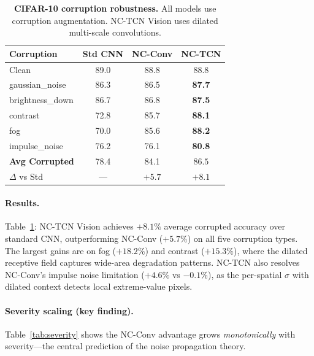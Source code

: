 \documentclass[10pt,twocolumn,letterpaper]{article}
\begin{document}
\begin{table}[t]
\centering
\caption{\textbf{CIFAR-10 corruption robustness.} All models use corruption augmentation. NC-TCN Vision uses dilated multi-scale convolutions.}
\label{tab:cifar10c}
\footnotesize
\setlength{\tabcolsep}{3pt}
\begin{tabular}{@{}lccc@{}}
\toprule
\textbf{Corruption} & \textbf{Std CNN} & \textbf{NC-Conv} & \textbf{NC-TCN} \\
\midrule
Clean              & 89.0 & 88.8 & 88.8 \\
\midrule
gaussian\_noise    & 86.3 & 86.5 & \textbf{87.7} \\
brightness\_down   & 86.7 & 86.8 & \textbf{87.5} \\
contrast           & 72.8 & 85.7 & \textbf{88.1} \\
fog                & 70.0 & 85.6 & \textbf{88.2} \\
impulse\_noise     & 76.2 & 76.1 & \textbf{80.8} \\
\midrule
\textbf{Avg Corrupted} & 78.4 & 84.1 & $\mathbf{86.5}$ \\
\midrule
$\Delta$ vs Std    & --- & $+5.7$ & $\mathbf{+8.1}$ \\
\bottomrule
\end{tabular}
\end{table}

\paragraph{Results.}
Table~\ref{tab:cifar10c}: NC-TCN Vision achieves $\mathbf{+8.1\%}$ average corrupted accuracy over standard CNN, outperforming NC-Conv ($+5.7\%$) on all five corruption types.
The largest gains are on fog ($+18.2\%$) and contrast ($+15.3\%$), where the dilated receptive field captures wide-area degradation patterns.
NC-TCN also resolves NC-Conv's impulse noise limitation ($+4.6\%$ vs $-0.1\%$), as the per-spatial $\sigma$ with dilated context detects local extreme-value pixels.

\paragraph{Severity scaling (key finding).}
Table~\ref{tab:severity} shows the NC-Conv advantage grows \emph{monotonically} with severity---the central prediction of the noise propagation theory.
\end{document}

